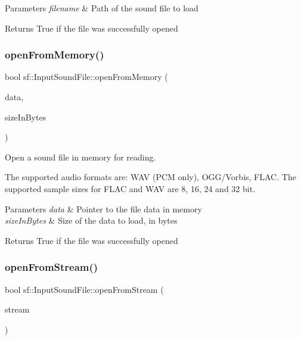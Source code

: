 \begin{DoxyParams}{Parameters}
{\em filename} & Path of the sound file to load\\
\hline
\end{DoxyParams}
\begin{DoxyReturn}{Returns}
True if the file was successfully opened 
\end{DoxyReturn}
\mbox{\label{classsf_1_1_input_sound_file_a4e034a8e9e69ca3c33a3f11180250400}} 
\subsubsection{\texorpdfstring{open\+From\+Memory()}{openFromMemory()}}
{\footnotesize\ttfamily bool sf\+::\+Input\+Sound\+File\+::open\+From\+Memory (\begin{DoxyParamCaption}\item[{const void $\ast$}]{data,  }\item[{std\+::size\+\_\+t}]{size\+In\+Bytes }\end{DoxyParamCaption})}



Open a sound file in memory for reading. 

The supported audio formats are\+: W\+AV (P\+CM only), O\+G\+G/\+Vorbis, F\+L\+AC. The supported sample sizes for F\+L\+AC and W\+AV are 8, 16, 24 and 32 bit.


\begin{DoxyParams}{Parameters}
{\em data} & Pointer to the file data in memory \\
\hline
{\em size\+In\+Bytes} & Size of the data to load, in bytes\\
\hline
\end{DoxyParams}
\begin{DoxyReturn}{Returns}
True if the file was successfully opened 
\end{DoxyReturn}
\mbox{\label{classsf_1_1_input_sound_file_a32b76497aeb088a2b46dc6efd819b909}} 
\subsubsection{\texorpdfstring{open\+From\+Stream()}{openFromStream()}}
{\footnotesize\ttfamily bool sf\+::\+Input\+Sound\+File\+::open\+From\+Stream (\begin{DoxyParamCaption}\item[{\hyperlink{classsf_1_1_input_stream}{Input\+Stream} \&}]{stream }\end{DoxyParamCaption})}



